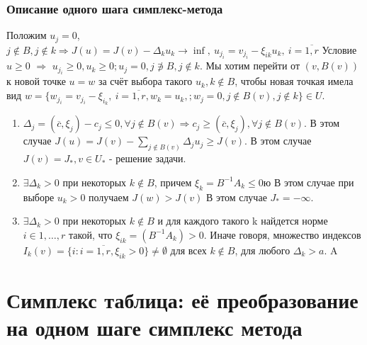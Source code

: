 \documentclass[9pt, a4paper]{extarticle}
\begin{document}
	\subsubsection*{Описание одного шага симплекс-метода}
	Положим $u_j = 0$, $j \notin B, j \notin k \Rightarrow J(u) = J(v) - \Delta_k u_k \to \inf, \ u_{j_i} = v_{j_i}  - \xi_{ik} u_k, \ i = \overline{1,r}$\newline
	Условие $u \geq 0$ $\Rightarrow$ $u_{j_i} \geq 0, u_k \geq 0; u_j = 0, j \notni B, j\notin k$. Мы хотим перейти от $(v, B(v))$ к новой точке $u = w$ за счёт выбора такого $u_k, k \notin B$, чтобы новая точкая имела вид $w = \{w_{j_i} = v_{j_i} - \xi_{i_k}, \ i = \overline{1,r}, w_k = u_k, ; w_j = 0, j\notin B(v), j \notin k\} \in U$. 
	\begin{enumerate}
		\item $\Delta_j = (\overline{c}, \xi_j) - c_j \leq 0, \forall j \notin B(v) \Rightarrow c_j \geq (\overline{c}, \xi_j), \forall j \notin B(v)$. В этом случае $J(u) = J(v) - \sum\limits_{j \notin B(v)} \Delta_j u_j \geq J(v)$. В этом случае $J(v) = J_*, v \in U_*$ - решение задачи.
		\item $\exists \Delta_k > 0$ при некоторых $k \notin B$, причем $\xi_k = B^{-1} A_k \leq 0$ю В этом случае при выборе $u_k >0$ получаем $J(w) > J(v)$ В этом случае $J_* = - \infty$. 
		\item $\exists \Delta_k > 0$ при некоторых $k \notin B$ и для каждого такого k найдется норме $i \in {1, \dots, r}$ такой, что $\xi_{ik} = (B^{-1}A_k) > 0$. Иначе говоря, множество индексов $I_k(v) = \{i: i = \overline{1,r}, \xi_{ik} > 0\} \neq \emptyset$ для всех $k \notin B$, для любого $\Delta_k > a$. A
	\end{enumerate}
\section{Симплекс таблица: её преобразование на одном шаге симплекс метода}
	
\end{document}
